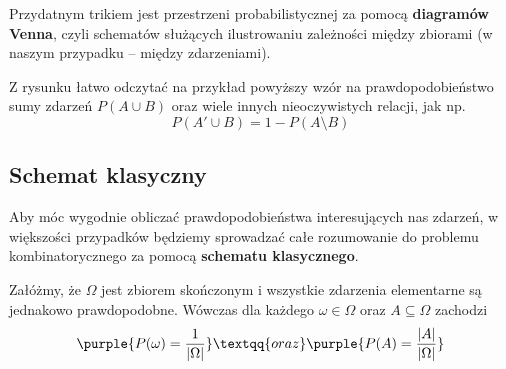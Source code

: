 \begin{wrapfigure}{r}{5cm}
    \vspace{-5mm}
    
\end{wrapfigure}

Przydatnym trikiem jest  przestrzeni probabilistycznej za pomocą \textbf{diagramów Venna}, czyli schematów służących ilustrowaniu zależności między zbiorami (w naszym przypadku -- między zdarzeniami).

Z rysunku łatwo odczytać na przykład powyższy wzór na prawdopodobieństwo sumy zdarzeń $P(A \cup B)$ oraz wiele innych nieoczywistych relacji, jak np.
$$P(A' \cup B) = 1 - P(A \setminus B)$$

\subsection{Schemat klasyczny}

Aby móc wygodnie obliczać prawdopodobieństwa interesujących nas zdarzeń, w większości przypadków będziemy sprowadzać całe rozumowanie do problemu kombinatorycznego za pomocą \textbf{schematu klasycznego}.

Załóżmy, że $\Omega$ jest zbiorem skończonym i wszystkie zdarzenia elementarne są jednakowo prawdopodobne. Wówczas dla każdego $\omega \in \Omega$ oraz $A \subseteq \Omega$ zachodzi
$$\purple{P(\omega) = \frac{1}{|\Omega|}} \textqq{oraz} \purple{P(A) = \frac{|A|}{|\Omega|}}$$

